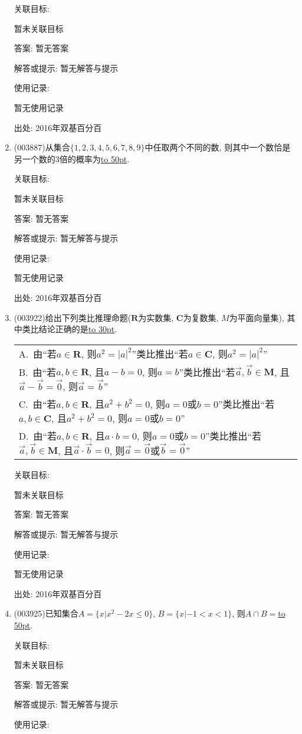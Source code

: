 \documentclass[10pt,a4paper]{article}
\newcommand{\blank}[1]{\underline{\hbox to #1pt{}}}
\newcommand{\onech}[4]{\par\begin{tabular}{p{.9\textwidth}}
A.~#1\\
B.~#2\\
C.~#3\\
D.~#4
\end{tabular}}
\begin{document}
\begin{enumerate}[1.]
关联目标:

暂未关联目标

答案: 暂无答案

解答或提示: 暂无解答与提示

使用记录:

暂无使用记录


出处: 2016年双基百分百
\item { (003887)}从集合$\{1,2,3,4,5,6,7,8,9\}$中任取两个不同的数, 则其中一个数恰是另一个数的$3$倍的概率为\blank{50}.


关联目标:

暂未关联目标

答案: 暂无答案

解答或提示: 暂无解答与提示

使用记录:

暂无使用记录


出处: 2016年双基百分百
\item { (003922)}给出下列类比推理命题($\mathbf{R}$为实数集, $\mathbf{C}$为复数集, $M$为平面向量集), 其中类比结论正确的是\blank{30}.
\onech{由``若$a\in \mathbf{R}$, 则$a^2=|a|^2$''类比推出``若$a\in \mathbf{C}$, 则$a^2=|a|^2$''}{由``若$a,b\in \mathbf{R}$, 且$a-b=0$, 则$a=b$''类比推出``若$\overrightarrow{a},\overrightarrow{b}\in \mathbf{M}$, 且$\overrightarrow a-\overrightarrow b=\overrightarrow 0$, 则$\overrightarrow a=\overrightarrow b$''}{由``若$a,b\in \mathbf{R}$, 且$a^2+b^2=0$, 则$a=0$或$b=0$''类比推出``若$a,b\in \mathbf{C}$, 且$a^2+b^2=0$, 则$a=0$或$b=0$''}{由``若$a,b\in \mathbf{R}$, 且$a\cdot b=0$, 则$a=0$或$b=0$''类比推出``若$\overrightarrow a, \overrightarrow b\in \mathbf{M}$, 且$\overrightarrow a\cdot \overrightarrow b=0$, 则$\overrightarrow a=\overrightarrow 0$或$\overrightarrow b=\overrightarrow 0$''}


关联目标:

暂未关联目标

答案: 暂无答案

解答或提示: 暂无解答与提示

使用记录:

暂无使用记录


出处: 2016年双基百分百
\item { (003925)}已知集合$A=\{x|x^2-2x\le 0 \}$, $B=\{x|-1<x<1\}$, 则$A\cap B=$\blank{50}.


关联目标:

暂未关联目标

答案: 暂无答案

解答或提示: 暂无解答与提示

使用记录:


\end{enumerate}
\end{document}
